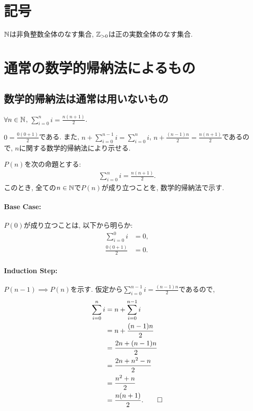 \section{記号}
$\mathbb{N}$は非負整数全体のなす集合,
$\mathbb{Z}_{>0}$は正の実数全体のなす集合.
\section{通常の数学的帰納法によるもの}
\subsection{数学的帰納法は通常は用いないもの}
\begin{prop}
  $\forall n\in\mathbb{N}$,
  $\sum_{i=0}^{n}i=\frac{n(n+1)}{2}$.
\end{prop}
\begin{proof**}
  $0=\frac{0(0+1)}{2}$である.
  また,
  $n+\sum_{i=0}^{n-1}i=\sum_{i=0}^{n}i$,
  $n+\frac{(n-1)n}{2}=\frac{n(n+1)}{2}$であるので,
  $n$に関する数学的帰納法により示せる.
\end{proof**}
\begin{proof*}
  $P(n)$を次の命題とする:
  \begin{align*}
    \sum_{i=0}^{n}i=\frac{n(n+1)}{2}.
  \end{align*}
  このとき, 全ての$n\in\mathbb{N}$で$P(n)$が成り立つことを,
  数学的帰納法で示す.

  \paragraph{Base Case:}
  $P(0)$が成り立つことは, 以下から明らか:
  \begin{align*}
    \sum_{i=0}^{0}i&=0,\\
    \frac{0(0+1)}{2}&=0.
  \end{align*}

  \paragraph{Induction Step:}
  $P(n-1)\implies P(n)$を示す.
  仮定から$\sum_{i=0}^{n-1}i=\frac{(n-1)n}{2}$であるので,
  \begin{align*}
    \sum_{i=0}^{n}i&=n+\sum_{i=0}^{n-1}i\\
    &=n+\frac{(n-1)n}{2}\\
    &=\frac{2n+(n-1)n}{2}\\
    &=\frac{2n+n^2-n}{2}\\
    &=\frac{n^2+n}{2}\\
    &=\frac{n(n+1)}{2}.
    \qedhere
  \end{align*}
\end{proof*}
